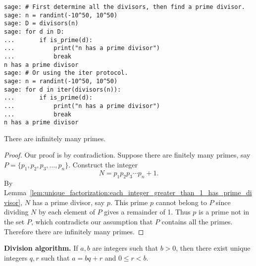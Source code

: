 \begin{lstlisting}
sage: # First determine all the divisors, then find a prime divisor.
sage: n = randint(-10^50, 10^50)
sage: D = divisors(n)
sage: for d in D:
...       if is_prime(d):
...           print("n has a prime divisor")
...           break
n has a prime divisor
sage: # Or using the iter protocol.
sage: n = randint(-10^50, 10^50)
sage: for d in iter(divisors(n)):
...       if is_prime(d):
...           print("n has a prime divisor")
...           break
n has a prime divisor
\end{lstlisting}

\begin{lemma}
There are infinitely many primes.
\end{lemma}

\begin{proof}
Our proof is by contradiction. Suppose there are finitely many primes,
say $P = \{p_1, p_2, p_3, \dots, p_n\}$. Construct the integer
\[
N
=
p_1 p_2 p_3 \cdots p_n + 1.
\]
By
Lemma~\ref{lem:unique_factorization:each_integer_greater_than_1_has_prime_divisor},
$N$ has a prime divisor, say $p$. This prime $p$ cannot belong to $P$
since dividing $N$ by each element of $P$ gives a remainder of 1. Thus
$p$ is a prime not in the set $P$, which contradicts our assumption
that $P$ contains all the primes. Therefore there are infinitely many
primes.
\end{proof}

\begin{theorem}
\label{thm:unique_factorization:division_algorithm}
\textbf{Division algorithm.}
If $a,b$ are integers such that $b > 0$, then there exist unique
integers $q,r$ such that $a = bq + r$ and $0 \leq r < b$.
\end{theorem}

